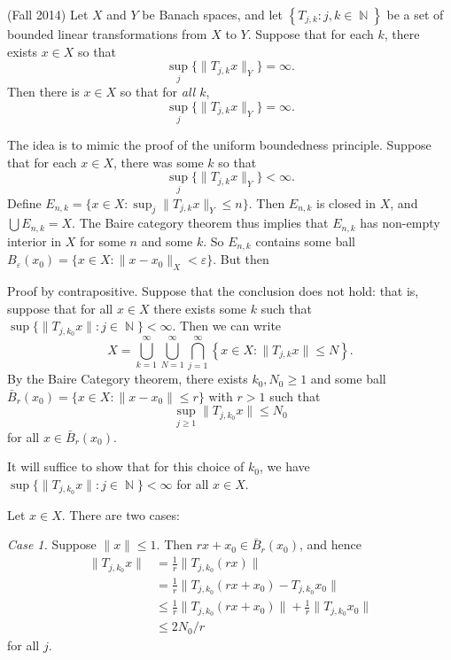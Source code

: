 \documentclass[answers]{exam}
\DeclareMathOperator{\NN}{\mathbb{N}}
\begin{document}
\begin{questions}
\item (Fall 2014)
	Let $X$ and $Y$ be Banach spaces, and let $\left\{ T_{j,k}: j,k\in \NN \right\}$ be a set of bounded linear transformations from $X$ to $Y$. Suppose that for each $k$, there exists $x \in X$ so that
	\[ \sup_j \{ \| T_{j,k} x \|_Y \} = \infty. \]
	Then there is $x \in X$ so that for \emph{all $k$},
	\[ \sup_j \{ \| T_{j,k} x \|_Y \} = \infty. \]
  \begin{solution}
  	The idea is to mimic the proof of the uniform boundedness principle. Suppose that for each $x \in X$, there was some $k$ so that
  	\[ \sup_j \{ \| T_{j,k} x \|_Y \} < \infty. \]
  	Define $E_{n,k} = \{ x \in X: \sup_j \| T_{j,k} x \|_Y \leq n \}$. Then $E_{n,k}$ is closed in $X$, and $\bigcup E_{n,k} = X$. The Baire category theorem thus implies that $E_{n,k}$ has non-empty interior in $X$ for some $n$ and some $k$. So $E_{n,k}$ contains some ball $B_\varepsilon(x_0) = \{ x \in X: \| x - x_0 \|_X < \varepsilon \}$. But then
  	\[  \]




    Proof by contrapositive. Suppose that the conclusion does not hold: that is, suppose that for all $x\in X$ there exists some $k$ such that $\sup \{ \|T_{j,k_{0}}x \|:j\in\NN\}<\infty$. Then we can write
\begin{equation*}
  X=\bigcup_{k= 1}^{\infty} \bigcup_{N= 1}^{\infty} \bigcap_{j= 1}^{\infty} \left\{ x\in X: \| T_{j,k}x \|\leq N \right\}.
\end{equation*}
By the Baire Category theorem, there exists $k_{0},N_{0}\geq 1$ and some ball $\bar{B}_{r}(x_{0})= \{x\in X : \| x-x_0 \|\leq r\}$ with $r>1$ such that $$\sup_{j\geq 1}\| T_{j,k_{0}}x \|\leq N_{0}$$ for all $x\in \bar{B}_r(x_0)$.

It will suffice to show that for this choice of $k_{0}$, we have $\sup \{\| T_{j,k_{0}}x \|: j\in \NN\}<\infty$ for all $x\in X$.

Let $x\in X$. There are two cases:

\textit{Case 1.} Suppose $\| x \|\leq 1$. Then $rx+x_{0}\in \bar{B}_{r}(x_{0})$, and hence
\begin{align*}
  \| T_{j,k_{0}}x \|
  &= \frac{1}{r}\| T_{j,k_{0}}(rx) \|\\ 
  &=  \frac{1}{r} \| T_{j,k_{0}}(rx + x_{0})-T_{j,k_{0}}x_{0} \|\\ 
  &\leq \frac{1}{r} \|T_{j,k_{0}}(rx + x_{0}) \| +\frac{1}{r} \| T_{j,k_{0}}x_{0} \|\\ 
  &\leq 2N_{0}/r
\end{align*}
for all $j$.


\end{solution}
\end{questions}
\end{document}
